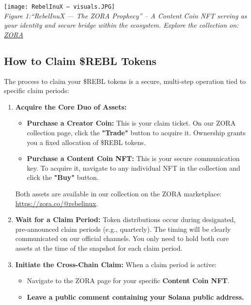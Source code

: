 \documentclass{article}
\begin{document}
\begin{center}
  \texttt{[image: RebelInuX — visuals.JPG]} %
  \\ %
\small\textit{Figure 1:``RebelInuX — The ZORA Prophecy'' – A Content Coin NFT serving as your identity and secure bridge within the ecosystem. Explore the collection on: \href{https://zora.co/@rebelinux}{ZORA}}
  \label{fig:contentcoin}
\end{center}

\begin{tcolorbox}[colback=headerColor!10!white, colframe=headerColor, boxrule=2pt, width=\textwidth, arc=6mm, left=8mm, right=8mm, top=6mm, bottom=6mm]
\subsection[
  \texorpdfstring{\color{primaryColor}How to Claim \$REBL Tokens}{How to Claim \$REBL Tokens}
]{\color{primaryColor}How to Claim \$REBL Tokens}

The process to claim your \$REBL tokens is a secure, multi-step operation tied to specific claim periods:

\begin{enumerate}
    \item \textbf{Acquire the Core Duo of Assets:}
    \begin{itemize}
        \item \textbf{Purchase a Creator Coin:} This is your claim ticket. On our ZORA collection page, click the \textbf{"Trade"} button to acquire it. Ownership grants you a fixed allocation of \$REBL tokens.
        \item \textbf{Purchase a Content Coin NFT:} This is your secure communication key. To acquire it, navigate to any individual NFT in the collection and click the \textbf{"Buy"} button.
    \end{itemize}
    Both assets are available in our collection on the ZORA marketplace: \href{https://zora.co/@rebelinux}{https://zora.co/@rebelinux}.

    \item \textbf{Wait for a Claim Period:} Token distributions occur during designated, pre-announced claim periods (e.g., quarterly). The timing will be clearly communicated on our official channels. You only need to hold both core assets at the time of the snapshot for each claim period.
    \item \textbf{Initiate the Cross-Chain Claim:} When a claim period is active:
    \begin{itemize}
        \item Navigate to the ZORA page for your specific \textbf{Content Coin NFT}.
        \item \textbf{Leave a public comment containing your Solana public address.}
    \end{itemize}


\end{enumerate}
\end{tcolorbox}
\end{document}
